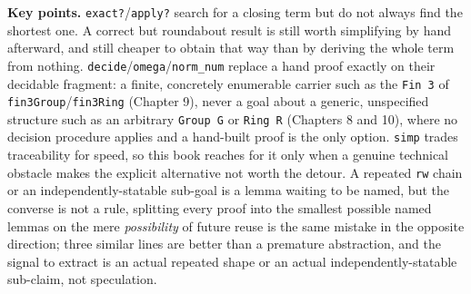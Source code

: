 \textbf{Key points.} \texttt{exact?}/\texttt{apply?} search for a closing term but do not always find the shortest one. A correct but roundabout result is still worth simplifying by hand afterward, and still cheaper to obtain that way than by deriving the whole term from nothing. \texttt{decide}/\texttt{omega}/\texttt{norm\_\allowbreak{}num} replace a hand proof exactly on their decidable fragment: a finite, concretely enumerable carrier such as the \texttt{Fin 3} of \texttt{fin3Group}/\texttt{fin3Ring} (Chapter 9), never a goal about a generic, unspecified structure such as an arbitrary \texttt{Group G} or \texttt{Ring R} (Chapters 8 and 10), where no decision procedure applies and a hand-built proof is the only option. \texttt{simp} trades traceability for speed, so this book reaches for it only when a genuine technical obstacle makes the explicit alternative not worth the detour. A repeated \texttt{rw} chain or an independently-statable sub-goal is a lemma waiting to be named, but the converse is not a rule, splitting every proof into the smallest possible named lemmas on the mere \emph{possibility} of future reuse is the same mistake in the opposite direction; three similar lines are better than a premature abstraction, and the signal to extract is an actual repeated shape or an actual independently-statable sub-claim, not speculation.

